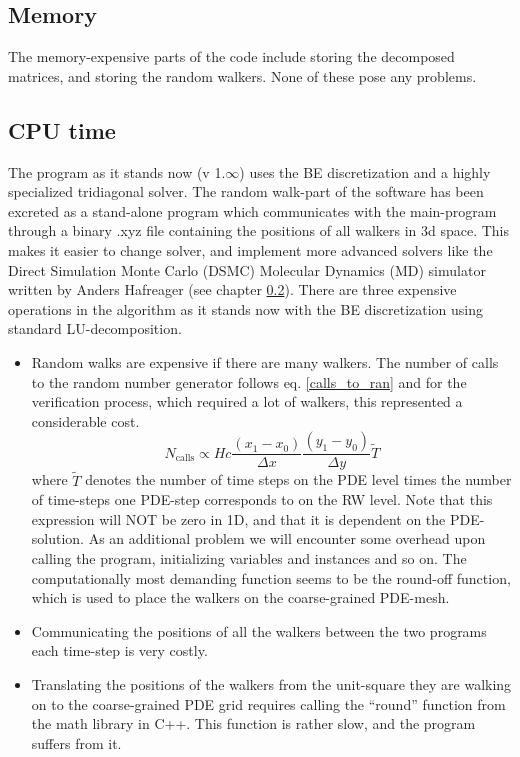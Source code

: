 \subsection{Memory}
The memory-expensive parts of the code include storing the decomposed matrices, and storing the random walkers. 
None of these pose any problems.

\subsection{CPU time}
The program as it stands now (v 1.$\infty$) uses the BE discretization and a highly specialized tridiagonal solver. 
The random walk-part of the software has been excreted as a stand-alone program which communicates with the main-program through a binary .xyz file containing the positions of all walkers in 3d space. This makes it easier to change solver, and implement more advanced solvers like the Direct Simulation Monte Carlo (DSMC) Molecular Dynamics (MD) simulator written by Anders Hafreager (see chapter \ref{}). 
There are three expensive operations in the algorithm as it stands now with the BE discretization using standard LU-decomposition.
\begin{itemize}
\item Random walks are expensive if there are many walkers. The number of calls to the random number generator follows eq. \eqref{calls_to_ran} and for the verification process, which required a lot of walkers, this represented a considerable cost. 
\begin{equation}\label{calls_to_ran}
 N_{\text{calls}} \propto Hc\frac{(x_1-x_0)}{\Delta x}\frac{(y_1-y_0)}{\Delta y}\tilde{T}
\end{equation}
where $\tilde{T}$ denotes the number of time steps on the PDE level times the number of time-steps one PDE-step corresponds to on the RW level. Note that this expression will NOT be zero in 1D, and that it is dependent on the PDE-solution.
As an additional problem we will encounter some overhead upon calling the program, initializing variables and instances and so on. 
The computationally most demanding function seems to be the round-off function, which is used to place the walkers on the coarse-grained PDE-mesh.
\item Communicating the positions of all the walkers between the two programs each time-step is very costly.
\item Translating the positions of the walkers from the unit-square they are walking on to the coarse-grained PDE grid requires calling the ``round'' function from the math library in C++. This function is rather slow, and the program suffers from it. 
\end{itemize}


